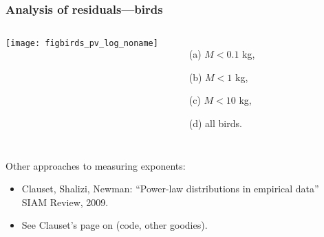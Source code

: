 \begin{frame}
  \frametitle{Analysis of residuals---birds}

  \begin{block}{}
  \begin{columns}
    \texttt{[image: figbirds\_pv\_log\_noname]}
    \begin{enumerate}
    \item[(a)] 
      $M<0.1$ kg,
    \item[(b)]
      $M<1$ kg,
    \item[(c)] 
      $M<10$ kg, 
    \item[(d)] 
      all birds.
    \end{enumerate}
  \end{columns}
  \end{block}


\end{frame}




\begin{frame}

  \begin{block}{Other approaches to measuring exponents:}
  \begin{itemize}
  \item 
    Clauset, Shalizi, Newman: ``Power-law distributions in empirical data''\cite{clauset2009b}\\
    SIAM Review, 2009.
  \item 
    See Clauset's page on 
    (code, other goodies).
  \end{itemize}
  \end{block}

\end{frame}


